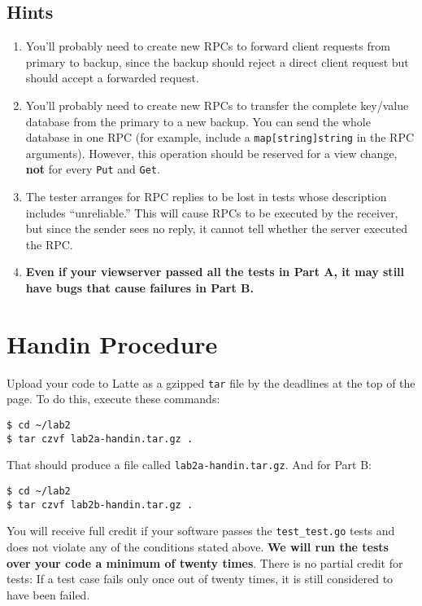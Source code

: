 \documentclass{article}
\newcommand{\code}{\texttt}
\begin{document}
\subsection{Hints}
\begin{enumerate}
    \item You'll probably need to create new RPCs to forward client requests from primary to backup, since the backup should reject a direct client request but should accept a forwarded request. 
    \item You'll probably need to create new RPCs to transfer the complete key/value database from the primary to a new backup. You can send the whole database in one RPC (for example, include a \code{map[string]string} in the RPC arguments). However, this operation should be reserved for a view change, \textbf{not} for every \code{Put} and \code{Get}.
    \item The tester arranges for RPC replies to be lost in tests whose description includes ``unreliable.'' This will cause RPCs to be executed by the receiver, but since the sender sees no reply, it cannot tell whether the server executed the RPC.
    \item \textbf{Even if your viewserver passed all the tests in Part A, it may still have bugs that cause failures in Part B.}
\end{enumerate}
\section{Handin Procedure}
Upload your code to Latte as a gzipped \code{tar} file by the deadlines at the top of the page. To do this, execute these commands: 
\begin{lstlisting}
$ cd ~/lab2 
$ tar czvf lab2a-handin.tar.gz . 
\end{lstlisting}
That should produce a file called \code{lab2a-handin.tar.gz}. And for Part B: 
\begin{lstlisting}
$ cd ~/lab2 
$ tar czvf lab2b-handin.tar.gz . 
\end{lstlisting}
You will receive full credit if your software passes the \code{test\_test.go} tests and does not violate any of the conditions stated above. \textbf{We will run the tests over your code a minimum of twenty times}. There is no partial credit for tests: If a test case fails only once out of twenty times, it is still considered to have been failed. 
\end{document}
